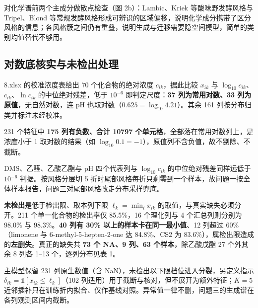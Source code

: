 \documentclass[zihao=-4,a4paper,UTF8,fontset=none]{ctexart}
\begin{document}
对化学谱前两个主成分做散点检查（图 2b）：Lambic、Kriek 等酸味野发酵风格与 Tripel、Blond 等常规发酵风格形成可辨识的区域偏移，说明化学成分携带了区分风格的信息；各风格簇之间仍有重叠，说明生成与迁移需要隐空间模型，简单的类别均值替代不够用。

\subsection{对数底核实与未检出处理}

8.xlsx 的校准浓度表给出 70 个化合物的绝对浓度 $c_{ik}$，据此比较 $x_{ik}$ 与 $\log_{10}c_{ik}$、$c_{ik}$、$\ln c_{ik}$ 的中位绝对残差，低于 $10^{-6}$ 即判定尺度：\textbf{37 列为常用对数、33 列为原值}，无自然对数，连 pH 也取对数（$0.625=\log_{10}4.21$）。其余 161 列按分布归类并标注未经校准。

231 个特征中 \textbf{175 列有负数、合计 10797 个单元格}，全部落在常用对数列上，是浓度小于 1 取对数的结果（如 $\log_{10}0.1=-1$），原值列不含负值，故不剔除、不截断。



DMS、乙醛、乙酸乙酯与 pH 四个代表列与 $\log_{10}c_{ik}$ 的中位绝对残差同样远低于 $10^{-6}$ 判据。按风格分层切 5 折时尾部风格每折只剩零到一个样本，故问题一按全体样本报告，问题三对尾部风格改走分布采样兜底。

\textbf{未检出}是低于检出限、取本列下限 $\ell_k=\min_i x_{ik}$ 的取值，与真实缺失必须分开。211 个单一化合物的检出率仅 85.5\%，16 个理化列与 4 个汇总列则分别为 98.0\% 与 98.3\%。\textbf{40 列有 30\% 以上的样本卡在同一最小值}、12 列超过 60\%（limonene 与 6-methyl-5-hepten-2-one 达 84.8\%、CS2 为 83.6\%），属检出限造成的\textbf{左删失}。真正的缺失共 \textbf{73 个 NA、9 列、63 个样本}，除乙酸戊酯 27 个外其余 8 列各 1--13 个，逐列分布见表 1。

主模型保留 231 列原生数值（含 NaN），未检出以下限档位进入分裂，另定义指示 $\delta_{ik}=\mathbb{1}[x_{ik}\le\ell_k]$（102 列适用）用于截断与核对，但不展开为额外特征；$K=5$ 近邻插补只在训练折内拟合、仅作基线对照。异常值一律不删，问题三的生成谱在各列观测区间内截断。
\end{document}
